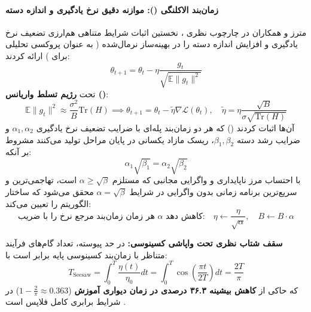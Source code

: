 \paragraph*{زمان‌بند الاکلنگی (): موازنه دقیق نرخ یادگیری و اندازه دسته}
مترز و همکاران در چارچوب نظری  \cite{meterez2026seesaw}، نخستین اثبات شرایط متناهی هم‌ارزی تضعیف نرخ یادگیری و افزایش اندازه دسته را در بهینه‌ساز  نرمال‌شده ( به عنوان پروکسی تحلیلی برای ) ارائه کردند:
\begin{equation}
    \theta_{t+1} = \theta_t - \eta \frac{g_t}{\sqrt{\mathbb{E}\|g_t\|^2}}
\end{equation}
تحت \textbf{رژیم تسلط واریانس ()}:
\begin{equation}
    \mathbb{E}\|g_t\|^2 \approx \frac{\sigma^2}{B} \text{Tr}(H) \implies \theta_{t+1} = \theta_t - \tilde{\eta} \nabla \mathcal{L}(\theta_t), \quad \tilde{\eta} = \eta \frac{\sqrt{B}}{\sigma \sqrt{\text{Tr}(H)}}
\end{equation}
آن‌ها اثبات کردند () که هر دو زمان‌بند پله‌ای با ضرایب تضعیف نرخ یادگیری $\alpha_1, \alpha_2$ و ضرایب رشد دسته $\beta_1, \beta_2$، ریسک مازاد یکسانی در پایان مراحل تولید می‌کنند مشروط بر آنکه:
\begin{equation}
    \alpha_1 \sqrt{\beta_1} = \alpha_2 \sqrt{\beta_2}
\end{equation}
با احتساب مرز ناپایداری و واگرایی مجانبی که مستلزم $\alpha \ge \sqrt{\beta}$ است، تهاجمی‌ترین و سریع‌ترین برنامه زمانی بدون واگرایی در شرایط $\alpha = \sqrt{\beta}$ محقق می‌شود که ساختار الگوریتم  را تعیین می‌کند:
\begin{equation}
    \text{هر زمان زمان‌بند مرجع نرخ را با ضریب } \alpha \text{ کاهش دهد:} \quad \eta \leftarrow \frac{\eta}{\sqrt{\alpha}}, \quad B \leftarrow B \cdot \alpha
\end{equation}

\noindent
\textbf{سقف شتاب نظری تحت واپاشی کسینوسی:} در حد پیوسته، تعداد گام‌های فرآیند متناظر با زمان‌بند کسینوسی پایه برابر است با:
\begin{equation}
    T_{\text{Seesaw}} = \int_0^T \frac{\eta(t)}{\eta_0} dt = \int_0^T \cos\left(\frac{\pi t}{2T}\right) dt = \frac{2T}{\pi}
\end{equation}
که حاکی از \textbf{کاهش بیشینه ۳۶.۳ درصدی در زمان دیواری آموزش} ($1 - \frac{2}{\pi} \approx 0.363$) در شرایط برابری کامل فلاپس است \cite{meterez2026seesaw}.

